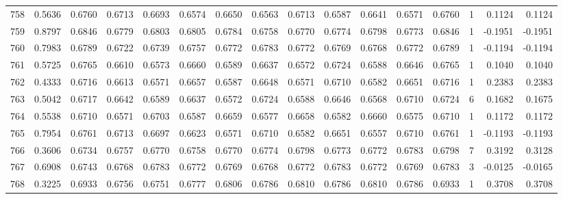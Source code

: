 \begin{tabular}{lrrrrrrrrrrrrrrr}
758 &      0.5636 &  0.6760 &  0.6713 &  0.6693 &  0.6574 &  0.6650 &  0.6563 &  0.6713 &  0.6587 &  0.6641 &   0.6571 &     0.6760 &      1 &                    0.1124 &                     0.1124 \\
759 &      0.8797 &  0.6846 &  0.6779 &  0.6803 &  0.6805 &  0.6784 &  0.6758 &  0.6770 &  0.6774 &  0.6798 &   0.6773 &     0.6846 &      1 &                   -0.1951 &                    -0.1951 \\
760 &      0.7983 &  0.6789 &  0.6722 &  0.6739 &  0.6757 &  0.6772 &  0.6783 &  0.6772 &  0.6769 &  0.6768 &   0.6772 &     0.6789 &      1 &                   -0.1194 &                    -0.1194 \\
761 &      0.5725 &  0.6765 &  0.6610 &  0.6573 &  0.6660 &  0.6589 &  0.6637 &  0.6572 &  0.6724 &  0.6588 &   0.6646 &     0.6765 &      1 &                    0.1040 &                     0.1040 \\
762 &      0.4333 &  0.6716 &  0.6613 &  0.6571 &  0.6657 &  0.6587 &  0.6648 &  0.6571 &  0.6710 &  0.6582 &   0.6651 &     0.6716 &      1 &                    0.2383 &                     0.2383 \\
763 &      0.5042 &  0.6717 &  0.6642 &  0.6589 &  0.6637 &  0.6572 &  0.6724 &  0.6588 &  0.6646 &  0.6568 &   0.6710 &     0.6724 &      6 &                    0.1682 &                     0.1675 \\
764 &      0.5538 &  0.6710 &  0.6571 &  0.6703 &  0.6587 &  0.6659 &  0.6577 &  0.6658 &  0.6582 &  0.6660 &   0.6575 &     0.6710 &      1 &                    0.1172 &                     0.1172 \\
765 &      0.7954 &  0.6761 &  0.6713 &  0.6697 &  0.6623 &  0.6571 &  0.6710 &  0.6582 &  0.6651 &  0.6557 &   0.6710 &     0.6761 &      1 &                   -0.1193 &                    -0.1193 \\
766 &      0.3606 &  0.6734 &  0.6757 &  0.6770 &  0.6758 &  0.6770 &  0.6774 &  0.6798 &  0.6773 &  0.6772 &   0.6783 &     0.6798 &      7 &                    0.3192 &                     0.3128 \\
767 &      0.6908 &  0.6743 &  0.6768 &  0.6783 &  0.6772 &  0.6769 &  0.6768 &  0.6772 &  0.6783 &  0.6772 &   0.6769 &     0.6783 &      3 &                   -0.0125 &                    -0.0165 \\
768 &      0.3225 &  0.6933 &  0.6756 &  0.6751 &  0.6777 &  0.6806 &  0.6786 &  0.6810 &  0.6786 &  0.6810 &   0.6786 &     0.6933 &      1 &                    0.3708 &                     0.3708 \\

\end{tabular}
